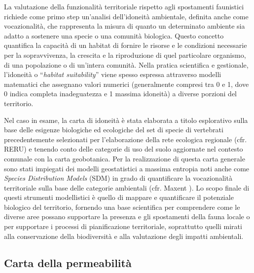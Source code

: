 \documentclass[
]{book}
\begin{document}
La valutazione della funzionalità territoriale rispetto agli spostamenti faunistici richiede come primo step un'analisi dell'idoneità ambientale, definita anche come vocazionalità, che rappresenta la misura di quanto un determinato ambiente sia adatto a sostenere una specie o una comunità biologica.
Questo concetto quantifica la capacità di un habitat di fornire le risorse e le condizioni necessarie per la sopravvivenza, la crescita e la riproduzione di quel particolare organismo, di una popolazione o di un'intera comunità.
Nella pratica scientifica e gestionale, l'idoneità o ``\emph{habitat suitability}'' viene spesso espressa attraverso modelli matematici che assegnano valori numerici (generalmente compresi tra 0 e 1, dove 0 indica completa inadeguatezza e 1 massima idoneità) a diverse porzioni del territorio.

Nel caso in esame, la carta di idoneità è stata elaborata a titolo esplorativo sulla base delle esigenze biologiche ed ecologiche del set di specie di vertebrati precedentemente selezionati per l'elaborazione della rete ecologica regionale (cfr. RERU) e tenendo conto delle categorie di uso del suolo aggiornate nel contesto comunale con la carta geobotanica.
Per la realizzazione di questa carta generale sono stati impiegati dei modelli geostatistici a massima entropia noti anche come \emph{Species Distribution Models} (SDM) in grado di quantificare la vocazionalità territoriale sulla base delle categorie ambientali (cfr. Maxent \citep{gomesSpeciesDistributionModelling2018}).
Lo scopo finale di questi strumenti modellistici è quello di mappare e quantificare il potenziale biologico del territorio, fornendo una base scientifica per comprendere come le diverse aree possano supportare la presenza e gli spostamenti della fauna locale o per supportare i processi di pianificazione territoriale, soprattutto quelli mirati alla conservazione della biodiversità e alla valutazione degli impatti ambientali.

\subsection{Carta della permeabilità}\label{carta-della-permeabilituxe0}
\end{document}
